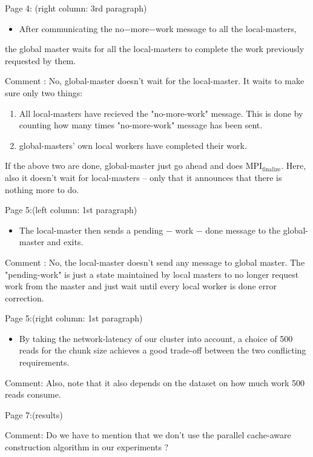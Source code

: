 \documentclass[integrals, nointegrals, article, 12pt, a4paper]{article}
\begin{document}
Page 4: (right column: 3rd paragraph)
\begin{itemize}
\item After communicating the no−more−work message to all the local-masters,
\end{itemize}
the global master waits for all the local-masters to complete the work
previously requested by them.

Comment : No, global-master doesn't wait for the local-master. It waits
to make sure only two things:
\begin{enumerate}
\item All local-masters have recieved the "no-more-work" message. This is
done by counting how many times "no-more-work" message has been sent.
\item global-masters' own local workers have completed their work.
\end{enumerate}
If the above two are done, global-master just go ahead and does
MPI$_{\text{finalize}}$. Here, also it doesn't wait for local-masters -- only that
it announces that there is nothing more to do.


Page 5:(left column: 1st paragraph)
\begin{itemize}
\item The local-master then sends a pending − work − done message to the
global-master and exits.
\end{itemize}

Comment : No, the local-master doesn't send any message to global
master. The "pending-work" is just a state maintained by local masters
to no longer request work from the master and just wait until every
local worker is done error correction.

Page 5:(right column: 1st paragraph)
\begin{itemize}
\item By taking the network-latency of our cluster into account, a choice of
500 reads for the chunk size achieves a good trade-off between the two
conflicting requirements.
\end{itemize}

Comment: Also, note that it also depends on the dataset on how much work
500 reads consume.

Page 7:(results)

Comment: Do we have to mention that we don't use the parallel
cache-aware construction algorithm in our experiments ?
\end{document}
